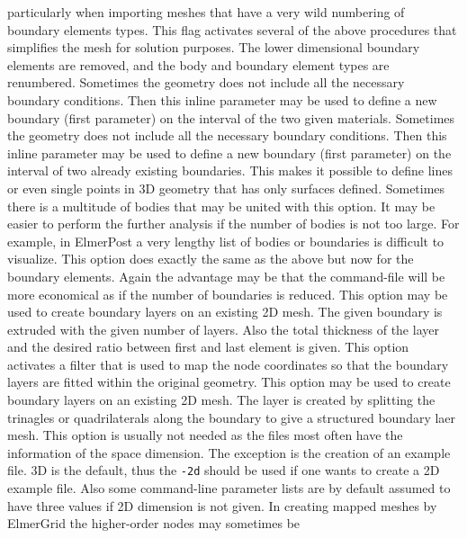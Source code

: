 particularly when importing meshes that have a very wild numbering of boundary elements types.
%
This flag activates several of the above procedures that simplifies the mesh
for solution purposes. The lower dimensional boundary elements are removed, 
and the body and boundary element types are renumbered.
%
Sometimes the geometry does not include all the necessary boundary conditions. 
Then this inline parameter may be used to define a new boundary 
(first parameter) on the interval of the two given materials.
%
Sometimes the geometry does not include all the necessary boundary conditions. 
Then this inline parameter may be used to define a new boundary 
(first parameter) on the interval of two already existing boundaries.
This makes it possible to define lines or even single points 
in 3D geometry that has only surfaces defined.
%
Sometimes there is a multitude of bodies that may be united with this option.
It may be easier to perform the further analysis if the number of bodies 
is not too large.
For example, in ElmerPost a very lengthy list of bodies or 
boundaries is difficult to visualize. 
%
This option does exactly the same as the above but now for the boundary
 elements.
Again the advantage may be that the command-file will be more economical as 
if the number of boundaries is reduced.
%
This option may be used to create boundary layers on an existing 2D mesh.
The given boundary is extruded with the given number of layers. Also the total
thickness of the layer and the desired ratio between first and last element
is given.
%
This option activates a filter that is used to map the node coordinates 
so that the boundary layers are fitted within the original geometry.
%
This option may be used to create boundary layers on an existing 2D mesh.
The layer is created by splitting the trinagles or quadrilaterals 
along the boundary to give a structured boundary laer mesh.
%
This option is usually not needed as the files most often have the information
of the space dimension. The exception is the creation of an example file.
3D is the default, thus the \texttt{-2d} should be used if one wants to create
a 2D example file. Also some command-line parameter lists are by default assumed to have 
three values if 2D dimension is not given.
%
In creating mapped meshes by ElmerGrid the higher-order nodes may sometimes be 
